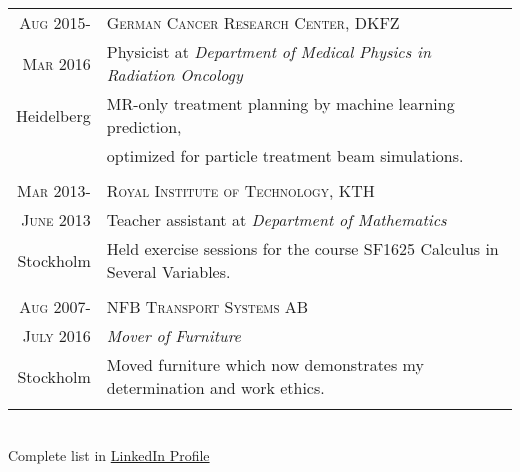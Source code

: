\documentclass[a4paper,10pt]{article}
\begin{document}
\begin{tabular}{r|p{16cm}}

 
 
 
 
 
 
 \textsc{Aug} 2015- & \textsc{German Cancer Research Center, DKFZ} \\
 \textsc{Mar} 2016& Physicist at \emph{Department of Medical Physics in Radiation Oncology}\\
 Heidelberg &\footnotesize{ MR-only treatment planning by machine learning prediction, } \\
 & \footnotesize{optimized for particle treatment beam simulations.} \\ \\
 
 
 \textsc{Mar} 2013- & \textsc{Royal Institute of Technology, KTH}\\
 \textsc{June} 2013 &Teacher assistant at \emph{Department of Mathematics}\\
 Stockholm&\footnotesize{Held exercise sessions for the course SF1625 Calculus in Several Variables. }\\ \\
 
 
 
\textsc{Aug} 2007- & \textsc{NFB Transport Systems AB}\\
 \textsc{July} 2016 & \emph{Mover of Furniture} \\
 
Stockholm & \footnotesize{Moved furniture which now demonstrates my determination and work ethics.} \\
  \\
\end{tabular}
\\
{\setlength\parindent{40pt} { \tiny Complete list in  \href{http://www.linkedin.com/in/danielbjorkman88}{LinkedIn Profile}} }
 \\
\end{document}
